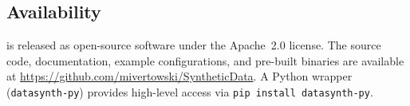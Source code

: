 \subsection{Availability}
\label{sec:availability}

\system{} is released as open-source software under the Apache~2.0
license.  The source code, documentation, example configurations,
and pre-built binaries are available at
\url{https://github.com/mivertowski/SyntheticData}.
A Python wrapper (\texttt{datasynth-py}) provides high-level access
via \texttt{pip install datasynth-py}.
